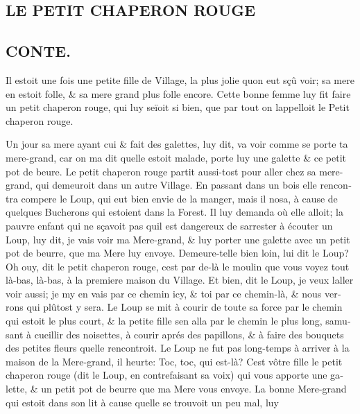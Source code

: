\documentclass[14pt,a4paper]{memoir}
\begin{document}
\begin{otherlanguage}{french}
\chapter{LE PETIT CHAPERON ROUGE}

\section{CONTE.}

Il estoit une fois une petite fille de Village, la plus jolie
qu\textquotesingle on eut sçû voir; sa mere en estoit folle, \& sa mere
grand plus folle encore. Cette bonne femme luy fit faire un petit
chaperon rouge, qui luy seïoit si bien, que par tout on
l\textquotesingle appelloit le Petit chaperon rouge.

Un jour sa mere ayant cui \& fait des galettes, luy dit, va voir comme
se porte ta mere-grand, car on m\textquotesingle a dit
qu\textquotesingle elle estoit malade, porte luy une galette \& ce petit
pot de beure. Le petit chaperon rouge partit aussi-tost pour aller chez
sa mere-grand, qui demeuroit dans un autre Village. En passant dans un
bois elle rencontra compere le Loup, qui eut bien envie de la manger,
mais il n\textquotesingle osa, à cause de quelques Bucherons qui
estoient dans la Forest. Il luy demanda où elle alloit; la pauvre enfant
qui ne sçavoit pas qu\textquotesingle il est dangereux de
s\textquotesingle arrester à écouter un Loup, luy dit, je vais voir ma
Mere-grand, \& luy porter une galette avec un petit pot de beurre, que
ma Mere luy envoye. Demeure-t\textquotesingle elle bien loin, lui dit le
Loup? Oh ouy, dit le petit chaperon rouge, c\textquotesingle est par
de-là le moulin que vous voyez tout là-bas, là-bas, à la premiere maison
du Village. Et bien, dit le Loup, je veux l\textquotesingle aller voir
aussi; je m\textquotesingle y en vais par ce chemin icy, \& toi par ce
chemin-là, \& nous verrons qui plûtost y sera. Le Loup se mit à courir
de toute sa force par le chemin qui estoit le plus court, \& la petite
fille s\textquotesingle en alla par le chemin le plus long,
s\textquotesingle amusant à cueillir des noisettes, à courir aprés des
papillons, \& à faire des bouquets des petites fleurs
qu\textquotesingle elle rencontroit. Le Loup ne fut pas long-temps à
arriver à la maison de la Mere-grand, il heurte: Toc, toc, qui est-là?
C\textquotesingle est vôtre fille le petit chaperon rouge (dit le Loup,
en contrefaisant sa voix) qui vous apporte une galette, \& un petit pot
de beurre que ma Mere vous envoye. La bonne Mere-grand qui estoit dans
son lit à cause qu\textquotesingle elle se trouvoit un peu mal, luy

\end{otherlanguage}
\end{document}

